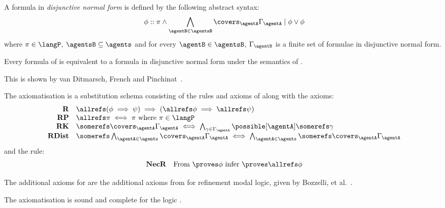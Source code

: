 \documentclass[twoside]{aiml14}
\begin{document}
  \begin{definition}\label{dnf}
      A formula in {\em disjunctive normal form} is defined by the following abstract syntax:
      $$
      \phi :: \pi \land \bigwedge_{\agentB \in \agentsB} \covers_\agentA \Gamma_\agentA \mid \phi \lor \phi
      $$
      where $\pi \in \langP$, $\agentsB \subseteq \agents$ and for every $\agentB \in \agentsB$,
      $\Gamma_\agentB$ is a finite set of formulae in disjunctive normal form.
  \end{definition}

  \begin{proposition}
      Every formula of \lang{} is equivalent to a formula in disjunctive normal
      form under the semantics of \logicK{}.
  \end{proposition}

  This is shown by van Ditmarsch, French and Pinchinat~\cite{vanditmarsch2010}.

  \begin{definition}
      The axiomatisation \axiomAamlK{} is a substitution schema consisting of
      the rules and axioms of \axiomAmlK{} along with the axioms:
      $$
      \begin{array}{rl}
          {\bf R}   & \allrefs (\phi \implies \psi) \implies (\allrefs \phi \implies \allrefs \psi)\\
          {\bf RP}  & \allrefs \pi \iff \pi \text{ where } \pi \in \langP\\
          {\bf RK}  & \somerefs \covers_\agentA \Gamma_\agentA \iff \bigwedge_{\gamma \in \Gamma_\agentA} \possible[\agentA] \somerefs \gamma\\
          {\bf RDist}  & \somerefs \bigwedge_{\agentA \in \agents} \covers_\agentA \Gamma_\agentA \iff \bigwedge_{\agentA \in \agents} \somerefs \covers_\agentA \Gamma_\agentA
      \end{array}
      $$
      and the rule:
      $$
      \begin{array}{rl}
          {\bf NecR} & \text{From $\proves \phi$ infer $\proves \allrefs \phi$}
      \end{array}
      $$
  \end{definition}
  
  The additional axioms for \axiomAamlK{} are the additional axioms from \axiomRmlK{} for refinement modal logic, given by Bozzelli, et al.~\cite{bozzelli2012a}.

  \begin{proposition}
      The axiomatisation \axiomAamlK{} is sound and complete for the logic \logicAamlK{}.
  \end{proposition}
\end{document}
